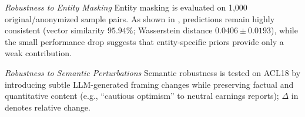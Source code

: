 \documentclass[a4paper,fleqn,doubleblind]{cas-sc}
\begin{document}
\textit{Robustness to Entity Masking}
Entity masking is evaluated on 1,000 original/anonymized sample pairs. As shown in , predictions remain highly consistent (vector similarity $95.94\%$; Wasserstein distance $0.0406\pm0.0193$), while the small performance drop suggests that entity-specific priors provide only a weak contribution.

\textit{Robustness to Semantic Perturbations}
Semantic robustness is tested on ACL18 by introducing subtle LLM-generated framing changes while preserving factual and quantitative content (e.g., ``cautious optimism'' to neutral earnings reports); $\Delta$ in  denotes relative change.

\begin{table}[!ht]
\centering
\small
\renewcommand{\arraystretch}{0.8}
\caption{Consistency of MarketToM Predictions With and Without Entity Masking}
\label{tab:masked_unmasked}
\end{table}
\end{document}
